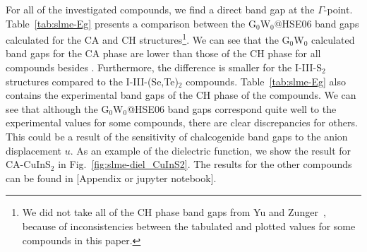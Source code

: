 \begin{refsection}
For all of the investigated compounds, we find a direct band gap at the 
$\Gamma$-point. Table~\ref{tab:slme-Eg} presents a comparison between the 
G$_0$W$_0$@HSE06 band gaps calculated for the CA and CH 
structures\footnote[4]{We did not take all of the CH phase band gaps from Yu 
and Zunger~\cite{Yu2012}, because of inconsistencies between the tabulated and 
plotted values for some compounds in this paper.}. We can see that the 
G$_0$W$_0$ calculated band gaps for the CA phase are lower than those of the 
CH phase for all compounds besides . Furthermore, the difference is 
smaller for the \mbox{I-III-S$_2$} structures compared to the 
\mbox{I-III-(Se,Te)$_2$} compounds. Table~\ref{tab:slme-Eg} also contains the 
experimental band gaps of the CH phase of the compounds. We can see that 
although the G$_0$W$_0$@HSE06 band gaps correspond quite well to the 
experimental values for some compounds, there are clear discrepancies for 
others. This could be a result of the sensitivity of chalcogenide band gaps to 
the anion displacement $u$. As an example of the dielectric function, we show 
the result for \mbox{CA-CuInS$_2$} in Fig.~\ref{fig:slme-diel_CuInS2}. The 
results for the other compounds can be found in [Appendix or jupyter 
notebook]. 
 
 

\end{refsection}
